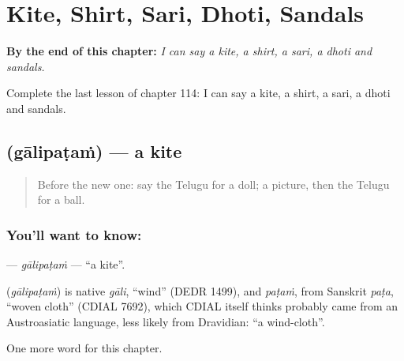 
\chapter{Kite, Shirt, Sari, Dhoti, Sandals}
\label{ch:te-kite-shirt-sari-dhoti-sandals}

\begin{chapteropening}
\textbf{By the end of this chapter:} \emph{I can say a kite, a shirt, a sari, a dhoti and sandals.}

Complete the last lesson of chapter 114: I can say a kite, a shirt, a sari, a dhoti and sandals.
\end{chapteropening}

\section[\texorpdfstring{\te{గాలిపటం} (gālipaṭaṁ)}{గాలిపటం (gālipaṭaṁ)}]{ (gālipaṭaṁ) — a kite}

\label{lesson:TE-C114-galipatam}



\begin{quote}
Before the new one: say the Telugu for a doll; a picture, then the Telugu for a ball.
\end{quote}

\subsection*{You'll want to know: }
\textbf{} — \emph{gālipaṭaṁ} — \textquotedblleft{}a kite\textquotedblright{}.

\begin{cousinweb}
\textbf{} (\emph{gālipaṭaṁ}) is native \emph{gāli}, \textquotedblleft{}wind\textquotedblright{} (DEDR 1499), and \emph{paṭaṁ}, from Sanskrit \emph{paṭa}, \textquotedblleft{}woven cloth\textquotedblright{} (CDIAL 7692), which CDIAL itself thinks probably came from an Austroasiatic language, less likely from Dravidian: \textquotedblleft{}a wind-cloth\textquotedblright{}.
\end{cousinweb}

\begin{grammarlens}[title={What you've built}]
One more word for this chapter.
\end{grammarlens}

